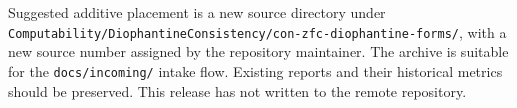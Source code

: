 \documentclass[11pt]{article}
\theoremstyle{definition}
\theoremstyle{remark}
\begin{document}
Suggested additive placement is a new source directory under
\nolinkurl{Computability/DiophantineConsistency/con-zfc-diophantine-forms/},
with a new source number assigned by the repository maintainer. The archive
is suitable for the \texttt{docs/incoming/} intake flow. Existing reports
and their historical metrics should be preserved. This release has not
written to the remote repository.
\end{document}
